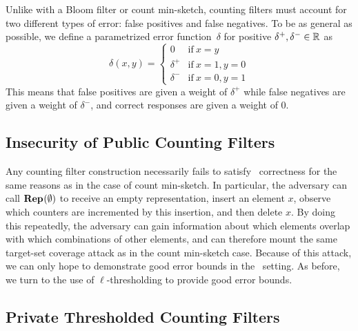 %
Unlike with a Bloom filter or count min-sketch, counting filters must account
for two different types of error: false positives and false negatives. To be as
general as possible, we define a parametrized error function~$\delta$ for
positive $\delta^+, \delta^- \in \mathbb{R}$ as
\begin{equation}
  \delta(x, y) =
  \begin{cases}
    0 & \text{if}\ x = y \\
    \delta^+ & \text{if}\ x = 1, y = 0 \\
    \delta^- & \text{if}\ x = 0, y = 1
  \end{cases}
\end{equation}
This means that false positives are given a weight of $\delta^+$ while false
negatives are given a weight of $\delta^-$, and correct responses are given a
weight of 0.

\subsection{Insecurity of Public Counting Filters}
Any counting filter construction necessarily fails to satisfy \errep\
correctness for the same reasons as in the case of count min-sketch. In
particular, the adversary can call $\textup{\textbf{Rep}}\hspace{0.5pt}(\emptyset)$ to receive an empty
representation, insert an element $x$, observe which counters are incremented by
this insertion, and then delete $x$. By doing this repeatedly, the adversary can
gain information about which elements overlap with which combinations of other
elements, and can therefore mount the same target-set coverage attack as in the
count min-sketch case. Because of this attack, we can only hope to demonstrate
good error bounds in the \erreps\ setting. As before, we turn to the use of
$\ell$-thresholding to provide good error bounds.

\subsection{Private Thresholded Counting Filters}

